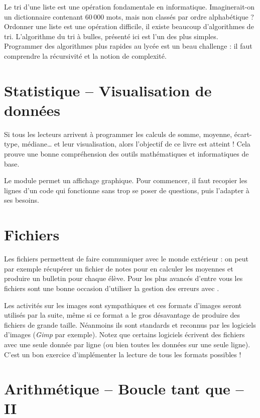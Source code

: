 \documentclass[11pt,class=report,crop=false]{standalone}
\begin{document}
Le tri d'une liste est une opération fondamentale en informatique. Imaginerait-on un dictionnaire contenant $60\,000$ mots, mais non classés par ordre alphabétique ?
Ordonner une liste est une opération difficile, il existe beaucoup d'algorithmes de tri. L'algorithme du tri à bulles, présenté ici est l'un des plus simples. Programmer des algorithmes plus rapides au lycée est un beau challenge : il faut comprendre la récursivité et la notion de complexité.


\section{Statistique -- Visualisation de données}

Si tous les lecteurs arrivent à programmer les calculs de somme, moyenne, écart-type, médiane\ldots{} et leur visualisation, alors l'objectif de ce livre est atteint ! Cela prouve une bonne compréhension des outils mathématiques et informatiques de base.

Le module  permet un affichage graphique. Pour commencer, il faut recopier les lignes d'un code qui fonctionne sans trop se poser de questions, puis l'adapter à ses besoins.


\section{Fichiers}

Les fichiers permettent de faire communiquer \Python{} avec le monde extérieur : on peut par exemple récupérer un fichier de notes pour en calculer les moyennes et produire un bulletin pour chaque élève.
Pour les plus avancés d'entre vous les fichiers sont une bonne occasion d'utiliser la gestion des erreurs avec .

Les activités sur les images sont sympathiques et ces formats d'images seront utilisés par la suite, même si ce format a le gros désavantage de produire des fichiers de grande taille. Néanmoins ils sont standards et reconnus par les logiciels d'images (\emph{Gimp} par exemple). Notez que certains logiciels écrivent des fichiers avec une seule donnée par ligne (ou bien toutes les données sur une seule ligne). C'est un bon exercice d'implémenter la lecture de tous les formats possibles !


\section{Arithmétique -- Boucle tant que -- II}
\end{document}
